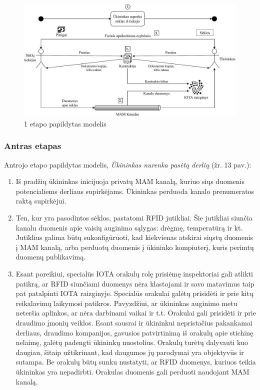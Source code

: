 \begin{figure}[H]
    \centering
    \includegraphics[scale=0.7]{images/iota-usecase-1}
    \caption{1 etapo papildytas modelis}
\end{figure}




\subsubsection{Antras etapas}

Antrojo etapo papildytas modelis, \textit{Ūkininkas nurenka pasėtą derlių} (žr. 13 pav.):
\begin{enumerate}
    \item Iš pradžių ūkininkas inicijuoja privatų MAM kanalą, kuriuo siųs duomenis potencialiems derliaus supirkėjams. Ūkininkas perduoda kanalo prenumeratos raktą supirkėjui.
    \item Ten, kur yra pasodintos sėklos, pastatomi RFID jutikliai. Šie jutikliai siunčia kanalu duomenis apie vaisių auginimo sąlygas: drėgmę, temperatūrą ir kt. Jutiklius galima būtų sukonfigūruoti, kad kiekvienas atskirai siųstų duomenis į MAM kanalą, arba perduotų duomenis į ūkininko kompiuterį, kuris perimtų duomenų publikavimą.
    \item Esant poreikiui, specialūs IOTA orakulų rolę prisiėmę inspektoriai gali atlikti patikrą, ar RFID siunčiami duomenys nėra klastojami ir savo matavimus taip pat patalpinti IOTA raizginyje. Specialūs orakulai galėtų prisidėti ir prie kitų reikalavimų laikymosi patikros. Pavyzdžiui, ar ūkininkas auginimo metu neteršia aplinkos, ar nėra darbinami vaikai ir t.t. Orakulai gali prisidėti ir prie draudimo įmonių veiklos. Esant sausrai ir ūkininkui nepristačius pakankamai derliaus, draudimo kompanijos, gavusios patvirtinimą iš orakulų apie stichinę nelaimę, galėtų padengti ūkininkų nuostolius. Orakulų turėtų dalyvauti kuo daugiau, šitaip užtikrinant, kad daugumos jų parodymai yra objektyvūs ir sutampa. Be orakulų būtų sunku nustatyti, ar RFID duomenys, kuriuos teikia ūkininkas yra nepadirbti. Orakulas duomenis gali perduoti naudojant MAM kanalą.
\end{enumerate}

